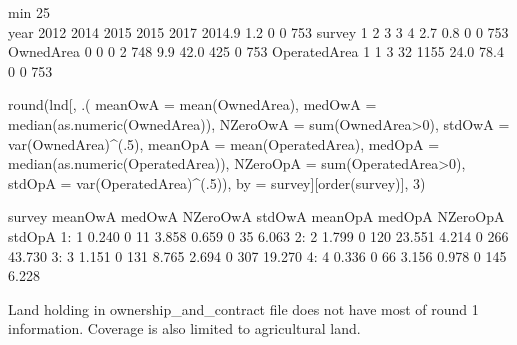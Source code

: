 \begin{Schunk}
\begin{Soutput}
              min 25\\% median 75\\%  max   mean  std  0s NAs   n
year         2012  2014   2015  2015 2017 2014.9  1.2   0   0 753
survey          1     2      3     3    4    2.7  0.8   0   0 753
OwnedArea       0     0      0     2  748    9.9 42.0 425   0 753
OperatedArea    1     1      3    32 1155   24.0 78.4   0   0 753
\end{Soutput}
\begin{Sinput}
round(lnd[, .(
  meanOwA = mean(OwnedArea), 
  medOwA = median(as.numeric(OwnedArea)), 
  NZeroOwA = sum(OwnedArea>0),
  stdOwA = var(OwnedArea)^(.5), 
  meanOpA = mean(OperatedArea), 
  medOpA = median(as.numeric(OperatedArea)), 
  NZeroOpA = sum(OperatedArea>0),
  stdOpA = var(OperatedArea)^(.5)), 
  by = survey][order(survey)], 3)
\end{Sinput}
\begin{Soutput}
   survey meanOwA medOwA NZeroOwA stdOwA meanOpA medOpA NZeroOpA stdOpA
1:      1   0.240      0       11  3.858   0.659      0       35  6.063
2:      2   1.799      0      120 23.551   4.214      0      266 43.730
3:      3   1.151      0      131  8.765   2.694      0      307 19.270
4:      4   0.336      0       66  3.156   0.978      0      145  6.228
\end{Soutput}
\end{Schunk}
Land holding in ownership\_and\_contract file does not have most of round 1 information. Coverage is also limited to agricultural land. 
